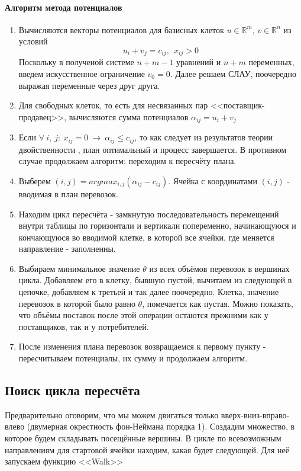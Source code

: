 \documentclass{article}
\begin{document}
\paragraph{Алгоритм метода потенциалов}
\begin{enumerate}
    \item Вычисляются векторы потенциалов для базисных клеток $u \in \mathbb{R}^m$, $v \in \mathbb{R}^n$ из условий
    $$u_i+v_j=c_{ij},~~x_{ij}>0 $$ Поскольку в полученой системе $n + m - 1$ уравнений и $n + m$ переменных, введем искусственное ограничение $v_0 = 0$. Далее решаем СЛАУ, поочередно выражая переменные через друг друга.
    \item Для свободных клеток, то есть для несвязанных пар <<поставщик-продавец>>, вычисляются сумма потенциалов $\alpha_{ij} = u_i+v_j$
    \item Если $\forall~i,~j:~ x_{ij}=0~ \rightarrow ~ \alpha_{ij} \le c_{ij}$, то как следует из результатов теории двойственности \cite{book2}, план оптимальный и процесс завершается. В противном случае продолжаем алгоритм: переходим к пересчёту плана.
    \item Выберем $(i,j)=argmax_{i,j}( \alpha_{ij} - c_{ij})$. Ячейка с координатами $(i,j)$ - вводимая в план перевозок.
    \item Находим цикл пересчёта - замкнутую последовательность перемещений внутри таблицы по горизонтали и вертикали попеременно, начинающуюся и кончающуюся во вводимой клетке, в которой все ячейки, где меняется направление - заполненны.
    \item Выбираем минимальное значение $\theta$ из всех объёмов перевозок в вершинах цикла. Добавляем его в клетку, бывшую пустой, вычитаем из следующей в цепочке, добавляем к третьей и так далее поочередно. Клетка, значение перевозок в которой было равно $\theta$, помечается как пустая. Можно показать, что объёмы поставок после этой операции остаются прежними как у поставщиков, так и у потребителей.
    \item После изменения плана перевозок возвращаемся к первому пункту - пересчитываем потенциалы, их сумму и продолжаем алгоритм.
\end{enumerate}

\subsection{Поиск цикла пересчёта} 
\noindent Предварительно оговорим, что мы можем двигаться только вверх-вниз-вправо-влево (двумерная окрестность фон-Неймана порядка 1). Создадим множество, в которое будем складывать посещённые вершины. В цикле по всевозможным направлениям для стартовой ячейки находим, какая будет следующей. Для неё запускаем функцию <<Walk>>
\end{document}
